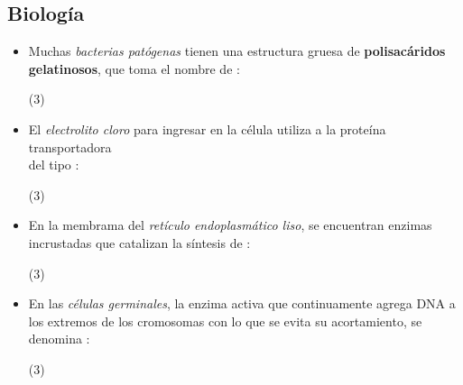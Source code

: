 \documentclass[10pt, twocolumn, landscape, a4paper]{article}
\begin{document}
\subsection*{Biología}
\begin{itemize}
\item{Muchas \emph{bacterias patógenas} tienen una estructura gruesa de \textbf{polisacáridos gelatinosos}, que toma el nombre de :
\begin{tasks}(3)
\end{tasks}
}
\item{El \emph{electrolito cloro} para ingresar en la célula utiliza a la proteína transportadora \\ del tipo : 
\begin{tasks}(3)
\end{tasks}
}
\item{En la membrama del \emph{retículo endoplasmático liso}, se encuentran enzimas incrustadas que catalizan la síntesis de :
\begin{tasks}(3)
\end{tasks}
}
\item{En las \emph{células germinales}, la enzima activa que continuamente agrega DNA a los extremos de los cromosomas con lo que se evita su acortamiento, se denomina :
\begin{tasks}(3)
\end{tasks}
}
\end{itemize}
\end{document}
